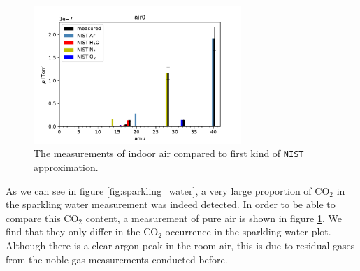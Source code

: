     
    
    \begin{figure}[h!]
    \centering
    \includegraphics[width=0.7\textwidth]{Report/DataResultsPlots/air0.pdf}
    \caption{The measurements of indoor air compared to first kind of \texttt{NIST} approximation.}
    \label{fig:air0}
    \end{figure}
    
    As we can see in figure \ref{fig:sparkling_water}, a very large proportion of CO$_2$ in the sparkling water measurement was indeed detected. In order to be able to compare this CO$_2$ content, a measurement of pure air is shown in figure \ref{fig:air0}. We find that they only differ in the CO$_2$ occurrence in the sparkling water plot. Although there is a clear argon peak in the room air, this is due to residual gases from the noble gas measurements conducted before. 
    \FloatBarrier
    